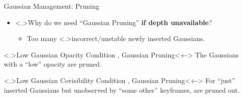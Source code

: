\begin{Frame}{Gaussian Management: Pruning}
	\begin{itemize}
		\setlength{\itemsep}{1.5ex}
		\item<+-> \alert<.>{Why} do we need ``Gaussian Pruning'' \textbf{if depth unavailable}?
			\vspace*{1.5ex}
			\begin{itemize}
				\setlength{\itemsep}{1.5ex}
				\item<+-> Too many \alert<.>{incorrect/unstable} newly inserted Gaussians.
			\end{itemize}
	\end{itemize}
	\vspace*{\fill}
	\begin{block}{\alert<.>{Low Gaussian Opacity} \hfill Condition , Gaussian Pruning}<+->
		The Gaussians with a ``low'' opacity are pruned.
	\end{block}
	\vspace*{\fill}
	\begin{block}{\alert<.>{Low Gaussian Covisibility} \hfill Condition , Gaussian Pruning}<+->
		For ``just'' inserted Gaussians but unobserved by ``some other'' keyframes, are pruned out.
	\end{block}
\end{Frame}

